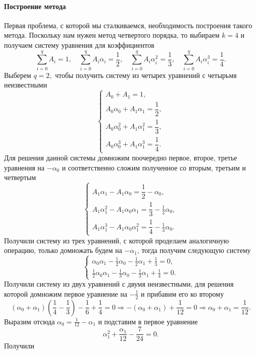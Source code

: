 \documentclass[11pt]{article}
\begin{document}
    \paragraph{Построение
метода}\label{ux43fux43eux441ux442ux440ux43eux435ux43dux438ux435-ux43cux435ux442ux43eux434ux430}

Первая проблема, с которой мы сталкиваемся, необходимость построения
такого метода. Поскольку нам нужен метод четвертого порядка, то выбираем
\(k=4\) и получаем систему уравнения для коэффициентов
\[\sum_{i=0}^q A_i = 1,\quad \sum_{i=0}^q A_i \alpha_i = \dfrac12,\quad \sum_{i=0}^q A_i\alpha_i^2 = \dfrac13,\quad \sum_{i=0}^q A_i\alpha_i^3=\frac{1}{4}.\]
Выберем \(q=2,\) чтобы получить систему из четырех уравнений с четырьмя
неизвестными \[\begin{cases}
A_0 + A_1 = 1,\\
A_0\alpha_0 + A_1\alpha_1 = \dfrac12,\\
A_0 \alpha_0^2 + A_1\alpha_1^2 = \dfrac13, \\
A_0 \alpha_0^3 + A_1\alpha_1^3 = \dfrac14.
\end{cases}\] Для решения данной системы домножим поочередно первое,
второе, третье уравнения на \(-\alpha_0\) и соответственно сложим
полученное со вторым, третьим и четвертым \[\begin{cases}
A_1\alpha_1 - A_1\alpha_0 = \dfrac12-\alpha_0,\\
A_1 \alpha_1^2 - A_1\alpha_0 \alpha_1 = \dfrac13-\frac{1}{2}\alpha_0, \\
A_1 \alpha_1^3 - A_1\alpha_0 \alpha_1^2 = \dfrac14-\frac{1}{3}\alpha_0.
\end{cases}\] Получили систему из трех уравнений, с которой проделаем
аналогичную операцию, только домножать будем на \(-\alpha_1\), тогда
получим следующую систему \[\begin{cases}
\alpha_0 \alpha_1 -\frac{1}{2}\alpha_0-\frac{1}{2}\alpha_1+\frac{1}{3}=0,\\
\frac{1}{2}\alpha_0 \alpha_1 -\frac{1}{3}\alpha_0-\frac{1}{3}\alpha_1+\frac{1}{4}=0.
\end{cases}\] Получили систему из двух уравнений с двумя неизвестными,
для решения которой домножим первое уравнение на \(-\frac{1}{2}\) и
прибавим его ко второму
\[(\alpha_0+\alpha_1)(\frac{1}{4}-\frac{1}{3})-\frac{1}{6}+\frac{1}{4}=0 \Rightarrow -(\alpha_0+\alpha_1)+\frac{1}{12}=0 \Rightarrow \alpha_0+\alpha_1=\frac{1}{12}.\]
Выразим отсюда \(\alpha_0=\frac{1}{12}-\alpha_1\) и подставим в первое
уравнение \[\alpha_1^2+\frac{\alpha_1}{12}-\frac{7}{24}=0.\] Получили
\end{document}
